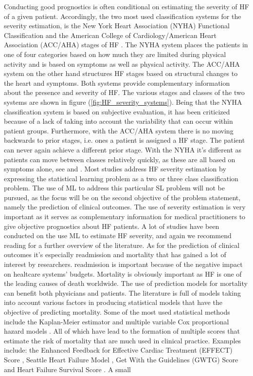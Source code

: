 \documentclass[../thesis.tex]{subfiles}
\begin{document}
\indent Conducting good prognostics is often conditional on estimating the severity of HF of a given patient. Accordingly, the two most used classification systems for the severity estimation, is the New York Heart Association (NYHA) Functional Classification \citep{new1994nomenclature} and the American College of Cardiology/American Heart Association (ACC/AHA) stages of HF \citep{hunt2001acc}. The NYHA system places the patients in one of four categories based on how much they are limited during physical activity and is based on symptoms as well as physical activity. The ACC/AHA system on the other hand structures HF stages based on structural changes to the heart and symptoms. Both systems provide complementary information about the presence and severity of HF. The various stages and classes of the two systems are shown in figure (\ref{fig:HF_severity_systems}). Being that the NYHA classification system is based on subjective evaluation, it has been criticized because of a lack of taking into account the variability that can occur within patient groups. Furthermore, with the ACC/AHA system there is no moving backwards to prior stages, i.e. ones a patient is assigned a HF stage. The patient can never again achieve a different prior stage. With the NYHA it's different as patients can move between classes relatively quickly, as these are all based on symptoms alone, see \cite{fleg2000assessment} and \cite{yancy2013}. Most studies address HF severity estimation by expressing the statistical learning problem as a two or three class classification problem. The use of ML to address this particular SL problem will not be pursued, as the focus will be on the second objective of the problem statement, namely the prediction of clinical outcomes. The use of severity estimation is very important as it serves as complementary information for medical practitioners to give objective prognostics about HF patients. A lot of studies have been conducted on the use ML to estimate HF severity, and again we recommend reading \cite{tripoliti2017heart} for a further overview of the literature. As for the prediction of clinical outcomes it's especially readmission and mortality that has gained a lot of interest by researchers. readmission is important because of the negative impact on healtcare systems' budgets. Mortality is obviously important as HF is one of the leading causes of death worldwide. The use of prediction models for mortality can benefit both physicians and patients. The literature is full of models taking into account various factors in producing statistical models that have the objective of predicting mortality. Some of the most used statistical methods include the Kaplan-Meier estimator \citep{kaplan1958nonparametric} and multiple variable Cox proportional hazard models \citep{cox1972regression}. All of which have lead to the formation of multiple scores that estimate the risk of mortality that are much used in clinical practice. Examples include: the Enhanced Feedback for Effective Cardiac Treatment (EFFECT) Score \citep{lee2003predicting}, Seattle Heart Failure Model \citep{levy2006seattle}, Get With the Guidelines (GWTG) Score \citep{peterson2010validated} and Heart Failure Survival Score \citep{ketchum2011multivariate}. A small 
\end{document}
